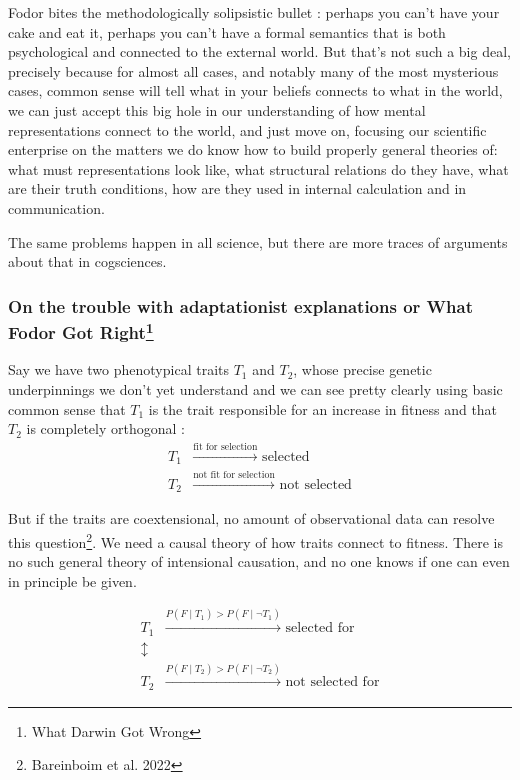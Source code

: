 \documentclass{cours}
\begin{document}
Fodor bites the methodologically solipsistic bullet\! : perhaps you can't have your cake and eat it, perhaps you can't have a formal semantics that is both psychological and connected to the external world. But that's not such a big deal, precisely because for almost all cases, and notably many of the most mysterious cases, common sense will tell what in your beliefs connects to what in the world, we can just accept this big hole in our understanding of how mental representations connect to the world, and just move on, focusing our scientific enterprise on the matters we do know how to build properly general theories of\!: what must representations look like, what structural relations do they have, what are their truth conditions, how are they used in internal calculation and in communication.

The same problems happen in all science, but there are more traces of arguments about that in cogsciences.

\subsubsection[On the trouble with adaptationist explanations or What Fodor Got Right]{On the trouble with adaptationist explanations or What Fodor Got Right\footnote{What Darwin Got Wrong}}
Say we have two phenotypical traits $T_{1}$ and $T_{2}$, whose precise genetic underpinnings we don't yet understand and we can see pretty clearly using basic common sense that $T_{1}$ is the trait responsible for an increase in fitness and that $T_{2}$ is completely orthogonal\! :
\[
  \begin{aligned}
      T_{1} &\xrightarrow{\text{fit for selection}} \text{ selected} \\
      T_{2} &\xrightarrow{\text{not fit for selection}} \text{ not selected}
  \end{aligned}
\]

But if the traits are coextensional, no amount of observational data can resolve this question\footnote{Bareinboim et al. 2022}. We need a causal theory of how traits connect to fitness. There is no such general theory of intensional causation, and no one knows if one can even in principle be given.

\[
    \begin{aligned}
        T_{1} & \xrightarrow{P(F\mid T_{1}) > P(F\mid \lnot T_{1})} \text{ selected for}\\
        \updownarrow & \\
        T_{2} & \xrightarrow{P(F\mid T_{2}) > P(F\mid \lnot T_{2})} \text{ not selected for}
    \end{aligned}    
\]
\end{document}
